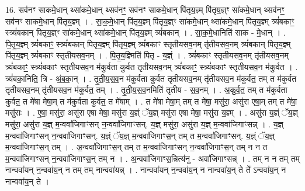 \documentclass[17pt]{extarticle}
\begin{document}
16. सव॑नꣳ साकमे॒धान् थ्सा॑कमे॒धान् थ्सव॑नꣳ॒॒ सव॑नꣳ साकमे॒धान् पि॑तृय॒ज्ञ्म् पि॑तृय॒ज्ञ्ꣳ सा॑कमे॒धान् थ्सव॑नꣳ॒॒ सव॑नꣳ साकमे॒धान् पि॑तृय॒ज्ञ्म् । . सा॒क॒मे॒धान् पि॑तृय॒ज्ञ्म् पि॑तृय॒ज्ञ्ꣳ सा॑कमे॒धान् थ्सा॑कमे॒धान् पि॑तृय॒ज्ञ्म् त्र्यं॑बकाꣳ॒॒ स्त्र्यं॑बकान् पितृय॒ज्ञ्ꣳ सा॑कमे॒धान् थ्सा॑कमे॒धान् पि॑तृय॒ज्ञ्म् त्र्यं॑बकान् । . सा॒क॒मे॒धानिति॑ साक - मे॒धान् । . पि॒तृ॒य॒ज्ञ्म् त्र्यं॑बकाꣳ॒॒ स्त्र्यं॑बकान् पितृय॒ज्ञ्म् पि॑तृय॒ज्ञ्म् त्र्यं॑बकाꣳ स्तृतीयसव॒नम् तृ॑तीयसव॒नम् त्र्यं॑बकान् पितृय॒ज्ञ्म् पि॑तृय॒ज्ञ्म् त्र्यं॑बकाꣳ स्तृतीयसव॒नम् । . पि॒तृ॒य॒ज्ञ्मिति॑ पितृ - य॒ज्ञ्ं । . त्र्यं॑बकाꣳ स्तृतीयसव॒नम् तृ॑तीयसव॒नम् त्र्यं॑बकाꣳ॒॒ स्त्र्यं॑बकाꣳ स्तृतीयसव॒न म॑कुर्वता कुर्वत तृतीयसव॒नम् त्र्यं॑बकाꣳ॒॒ स्त्र्यं॑बकाꣳ स्तृतीयसव॒न म॑कुर्वत । . त्र्यं॑बका॒निति॒ त्रि - अं॒ब॒का॒न् । . तृ॒ती॒य॒स॒व॒न म॑कुर्वता कुर्वत तृतीयसव॒नम् तृ॑तीयसव॒न म॑कुर्वत॒ तम् त म॑कुर्वत तृतीयसव॒नम् तृ॑तीयसव॒न म॑कुर्वत॒ तम् । . तृ॒ती॒य॒स॒व॒नमिति॑ तृतीय - स॒व॒नम् । . अ॒कु॒र्व॒त॒ तम् त म॑कुर्वता कुर्वत॒ त मे॑षा मेषा॒म् त म॑कुर्वता कुर्वत॒ त मे॑षाम् । . त मे॑षा मेषा॒म् तम् त मे॑षा॒ मसु॑रा॒ असु॑रा एषा॒म् तम् त मे॑षा॒ मसु॑राः । . ए॒षा॒ मसु॑रा॒ असु॑रा एषा मेषा॒ मसु॑रा य॒ज्ञ्ं ॅय॒ज्ञ् मसु॑रा एषा मेषा॒ मसु॑रा य॒ज्ञ्म् । . असु॑रा य॒ज्ञ्ं ॅय॒ज्ञ् मसु॑रा॒ असु॑रा य॒ज्ञ् म॒न्ववा॑जिगाꣳसन् न॒न्ववा॑जिगाꣳसन्. य॒ज्ञ् मसु॑रा॒ असु॑रा य॒ज्ञ् म॒न्ववा॑जिगाꣳसन्न् । . य॒ज्ञ् म॒न्ववा॑जिगाꣳसन् न॒न्ववा॑जिगाꣳसन्. य॒ज्ञ्ं ॅय॒ज्ञ् म॒न्ववा॑जिगाꣳस॒न् तम् त म॒न्ववा॑जिगाꣳसन्. य॒ज्ञ्ं ॅय॒ज्ञ् म॒न्ववा॑जिगाꣳस॒न् तम् । . अ॒न्ववा॑जिगाꣳस॒न् तम् त म॒न्ववा॑जिगाꣳसन् न॒न्ववा॑जिगाꣳस॒न् तम् न न त म॒न्ववा॑जिगाꣳसन् न॒न्ववा॑जिगाꣳस॒न् तम् न । . अ॒न्ववा॑जिगाꣳस॒न्नित्य॑नु - अवा॑जिगाꣳसन्न् । . तम् न न तम् तम् नान्ववा॑यन् न॒न्ववा॑य॒न् न तम् तम् नान्ववा॑यन्न् । . नान्ववा॑यन् न॒न्ववा॑य॒न् न नान्ववा॑य॒न् ते ते᳚ ऽन्ववा॑य॒न् न नान्ववा॑य॒न् ते । \newline
\end{document}

